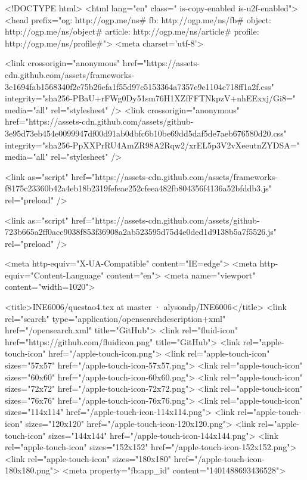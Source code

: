 



<!DOCTYPE html>
<html lang="en" class=" is-copy-enabled is-u2f-enabled">
  <head prefix="og: http://ogp.me/ns# fb: http://ogp.me/ns/fb# object: http://ogp.me/ns/object# article: http://ogp.me/ns/article# profile: http://ogp.me/ns/profile#">
    <meta charset='utf-8'>

    <link crossorigin="anonymous" href="https://assets-cdn.github.com/assets/frameworks-3c1694fab1568340f2e75b26efa1f55d97c5153364a7357e9e1104c718ff1a2f.css" integrity="sha256-PBaU+rFWg0Dy51sm76H1XZfFFTNkpzV+nhEExxj/Gi8=" media="all" rel="stylesheet" />
    <link crossorigin="anonymous" href="https://assets-cdn.github.com/assets/github-3e95d73eb454e0099947df00d91ab0dbfc6b10be69dd5daf5de7aeb676580d20.css" integrity="sha256-PpXXPrRU4AmZR98A2Rqw2/xrEL5p3V2vXeeutnZYDSA=" media="all" rel="stylesheet" />
    
    
    
    

    <link as="script" href="https://assets-cdn.github.com/assets/frameworks-f8175c23360b42a4eb18b2319fefeae252cfeea482fb804356f4136a52bfddb3.js" rel="preload" />
    
    <link as="script" href="https://assets-cdn.github.com/assets/github-723b665a2ff0acc9038f853f36908a2ab523595d75d4e0ded1d9138b5a7f5526.js" rel="preload" />

    <meta http-equiv="X-UA-Compatible" content="IE=edge">
    <meta http-equiv="Content-Language" content="en">
    <meta name="viewport" content="width=1020">
    
    
    <title>INE6006/questao4.tex at master · alysondp/INE6006</title>
    <link rel="search" type="application/opensearchdescription+xml" href="/opensearch.xml" title="GitHub">
    <link rel="fluid-icon" href="https://github.com/fluidicon.png" title="GitHub">
    <link rel="apple-touch-icon" href="/apple-touch-icon.png">
    <link rel="apple-touch-icon" sizes="57x57" href="/apple-touch-icon-57x57.png">
    <link rel="apple-touch-icon" sizes="60x60" href="/apple-touch-icon-60x60.png">
    <link rel="apple-touch-icon" sizes="72x72" href="/apple-touch-icon-72x72.png">
    <link rel="apple-touch-icon" sizes="76x76" href="/apple-touch-icon-76x76.png">
    <link rel="apple-touch-icon" sizes="114x114" href="/apple-touch-icon-114x114.png">
    <link rel="apple-touch-icon" sizes="120x120" href="/apple-touch-icon-120x120.png">
    <link rel="apple-touch-icon" sizes="144x144" href="/apple-touch-icon-144x144.png">
    <link rel="apple-touch-icon" sizes="152x152" href="/apple-touch-icon-152x152.png">
    <link rel="apple-touch-icon" sizes="180x180" href="/apple-touch-icon-180x180.png">
    <meta property="fb:app_id" content="1401488693436528">

